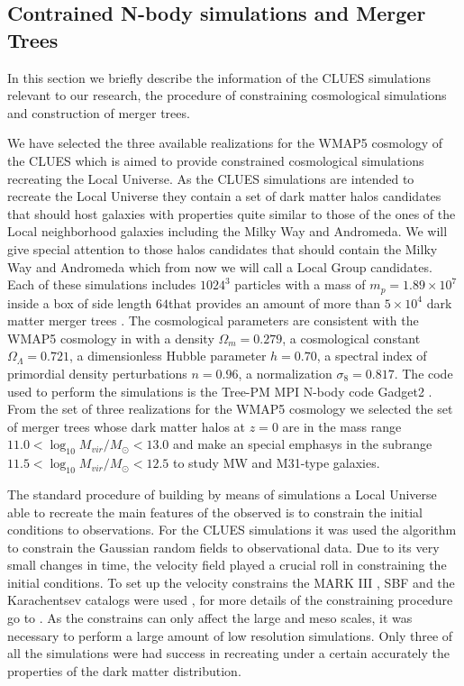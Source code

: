 \documentclass[usenatbib]{mn2e}
\newcommand{\hMpc}{{\ifmmode{h^{-1}{\rm Mpc}}\else{$h^{-1}$Mpc }\fi}}
\newcommand{\hMsun}{{\ifmmode{h^{-1}{\rm {M_{\odot}}}}\else{$h^{-1}{\rm{M_{\odot}}}$}\fi}}
\begin{document}
\subsection{Contrained N-body simulations and Merger Trees}
\label{sec:simulations}
In this section we briefly describe the information of the CLUES simulations relevant to our research, the procedure of constraining cosmological simulations and 
construction of merger trees. 

We have selected the three available realizations for the WMAP5 cosmology of the CLUES \citep{2010arXiv1005.2687G}
which is aimed to provide constrained cosmological simulations recreating the Local Universe. As the CLUES simulations are intended to recreate the Local Universe
 they contain a set of dark matter halos candidates that should host galaxies with properties quite similar to those of the ones of the Local neighborhood galaxies
 including the Milky Way and Andromeda. We will give special attention to those halos candidates that should contain the Milky Way and Andromeda which from now we 
will call a Local Group candidates. Each of these simulations includes $1024^3$ particles with a mass of $m_{p}=1.89\times 10^{7}$\hMsun inside a box of side length $64$\hMpc  that provides an amount of more than
 $5\times 10^4$ dark matter merger trees \citep{2011arXiv1107.0017F}. The cosmological parameters are consistent with the WMAP5 cosmology in \cite{2009ApJS..180..330K}
 with a density $\Omega_{m}=0.279$, a cosmological constant $\Omega_{\Lambda} = 0.721$, a dimensionless Hubble parameter $h=0.70$, a spectral index of primordial
 density perturbations $n=0.96$, a normalization $\sigma_{8}=0.817$.  The code used to perform the simulations is the Tree-PM MPI N-body code Gadget2 \citep{2005MNRAS.364.1105S}. 
 From the set of three  realizations for the WMAP5 cosmology   we selected the set of merger trees whose dark matter halos at $z=0$ are in the mass 
range $11.0<\log_{10} M_{vir}/M_{\odot}<13.0$ and make an special emphasys in the subrange $11.5<\log_{10} M_{vir}/M_{\odot}<12.5$ to study MW and M31-type galaxies.  



The standard procedure of building by means of simulations a Local Universe able to recreate the main features of the observed is to constrain the initial conditions
to observations. For the CLUES simulations it was used the \cite{1991ApJ...380L...5H} algorithm  to constrain the Gaussian random fields to observational data. Due to
its very small changes in time, the velocity field played a crucial roll in constraining the initial conditions. To set up the velocity constrains the MARK
  III \citep{1997ApJS..109..333W}, SBF \citep{2001ApJ...546..681T} and the Karachentsev \citep{2004AJ....127.2031K} catalogs were used \citep{2011arXiv1107.0017F},
for more details of the constraining procedure go to \cite{2010arXiv1005.2687G}. As the constrains can only affect the large and meso scales, it was necessary to 
perform a large amount of low resolution simulations. Only three of all the simulations were had success in recreating under a certain accurately the properties
of the dark matter distribution.
\end{document}
